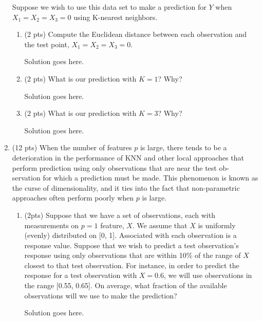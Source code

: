 \documentclass[a4paper]{article}
\theoremstyle{definition}
\newenvironment{soln}{
    \leavevmode\color{blue}\ignorespaces
}{}
\begin{document}
\begin{enumerate}
Suppose we wish to use this data set to make a prediction for $Y$ when $X_{1} = X_{2} = X_{3} = 0$ using K-nearest neighbors.

\begin{enumerate}
	\item (2 pts) Compute the Euclidean distance between each observation and the test point, $X_{1} = X_{2} = X_{3}=0$.
 
	\begin{soln}  Solution goes here. \end{soln}
 
	\item (2 pts) What is our prediction with $K=1$? Why?
	
	\begin{soln}  Solution goes here. \end{soln}
	
	\item (2 pts) What is our prediction with $K=3$? Why?
	
	\begin{soln}  Solution goes here. \end{soln}

\end{enumerate}

\item (12 pts) When the number of features $p$ is large, there tends to be a deterioration in the performance of KNN and other local approaches that perform prediction using only observations that are near the test ob- servation for which a prediction must be made. This phenomenon is known as the curse of dimensionality, and it ties into the fact that non-parametric approaches often perform poorly when $p$ is large.

\begin{enumerate}
	\item (2pts) Suppose that we have a set of observations, each with measurements on $p=1$ feature, $X$. We assume that $X$ is uniformly (evenly) distributed on [0, 1]. Associated with each observation is a response value. Suppose that we wish to predict a test observation’s response using only observations that are within 10\% of the range of $X$ closest to that test observation. For instance, in order to predict the response for a test observation with $X=0.6$, we will use observations in the range [0.55, 0.65]. On average, what fraction of the available observations will we use to make the prediction?
	
	\begin{soln}  Solution goes here. \end{soln}
	

\end{enumerate}
\end{enumerate}
\end{document}
